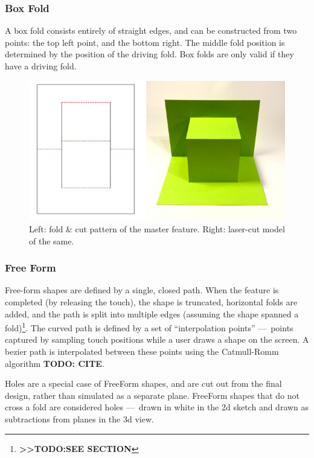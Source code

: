 \subsubsection{Box Fold}\label{box-fold}

A box fold consists entirely of straight edges, and can be constructed
from two points: the top left point, and the bottom right. The middle
fold position is determined by the position of the driving fold. Box
folds are only valid if they have a driving fold.

\begin{figure}[htbp]
\centering
\includegraphics{figures/33_UI_Interface_Data_Structures/box.pdf}
\caption{Left: fold \& cut pattern of the master feature. Right:
laser-cut model of the same.}
\end{figure}

\subsubsection{Free Form}\label{free-form}

Free-form shapes are defined by a single, closed path. When the feature
is completed (by releasing the touch), the shape is truncated,
horizontal folds are added, and the path is split into multiple edges
(assuming the shape spanned a fold)\footnote{\textbf{\textgreater{}\textgreater{}TODO:SEE
  SECTION}}. The curved path is defined by a set of ``interpolation
points'' ---~points captured by sampling touch positions while a user
draws a shape on the screen. A bezier path is interpolated between these
points using the Catmull-Romm algorithm \textbf{TODO: CITE}.

Holes are a special case of FreeForm shapes, and are cut out from the
final design, rather than simulated as a separate plane. FreeForm shapes
that do not cross a fold are considered holes ---~drawn in white in the
2d sketch and drawn as subtractions from planes in the 3d view.

